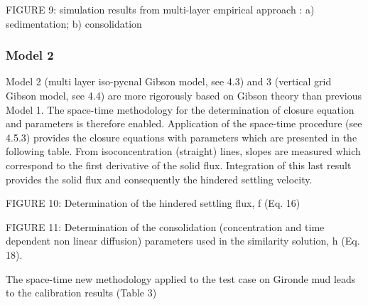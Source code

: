 FIGURE 9: simulation results from multi-layer empirical approach : a)
sedimentation; b) consolidation


\subsubsection*{Model 2}

Model 2 (multi layer iso-pycnal Gibson model, see 4.3) and 3 (vertical grid
Gibson model, see 4.4) are more rigorously based on Gibson theory than
previous Model 1. The space-time methodology for the determination of
closure equation and parameters is therefore enabled.\newline
Application of the space-time procedure (see 4.5.3) provides the closure
equations with parameters which are presented in the following table. From
isoconcentration (straight) lines, slopes are measured which correspond to
the first derivative of the solid flux. Integration of this last result
provides the solid flux and consequently the hindered settling velocity.

FIGURE 10:
Determination of the hindered settling flux, f (Eq. 16)

FIGURE 11:
Determination of the consolidation (concentration and time dependent non
linear diffusion) parameters used in the similarity solution, h (Eq. 18).

The space-time new methodology applied to the test case on Gironde mud leads
to the calibration results (Table 3)

